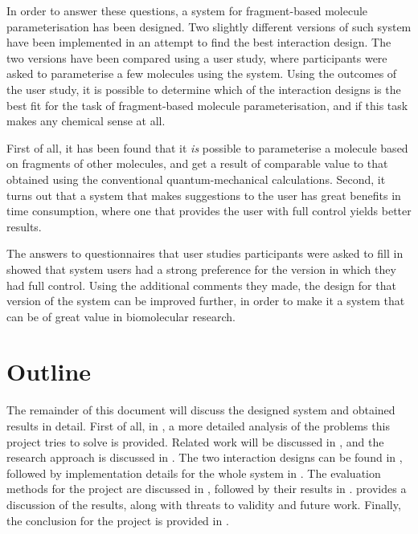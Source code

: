 In order to answer these questions, a system for fragment-based molecule parameterisation has been designed. Two slightly different versions of such system have been implemented in an attempt to find the best interaction design. The two versions have been compared using a user study, where participants were asked to parameterise a few molecules using the system. Using the outcomes of the user study, it is possible to determine which of the interaction designs is the best fit for the task of fragment-based molecule parameterisation, and if this task makes any chemical sense at all.

First of all, it has been found that it \emph{is} possible to parameterise a molecule based on fragments of other molecules, and get a result of comparable value to that obtained using the conventional quantum-mechanical calculations. Second, it turns out that a system that makes suggestions to the user has great benefits in time consumption, where one that provides the user with full control yields better results.

The answers to questionnaires that user studies participants were asked to fill in showed that system users had a strong preference for the version in which they had full control. Using the additional comments they made, the design for that version of the system can be improved further, in order to make it a system that can be of great value in biomolecular research.

\section{Outline}
The remainder of this document will discuss the designed system and obtained results in detail. First of all, in , a more detailed analysis of the problems this project tries to solve is provided. Related work will be discussed in , and the research approach is discussed in . The two interaction designs can be found in , followed by implementation details for the whole system in . The evaluation methods for the project are discussed in , followed by their results in .  provides a discussion of the results, along with threats to validity and future work. Finally, the conclusion for the project is provided in .
